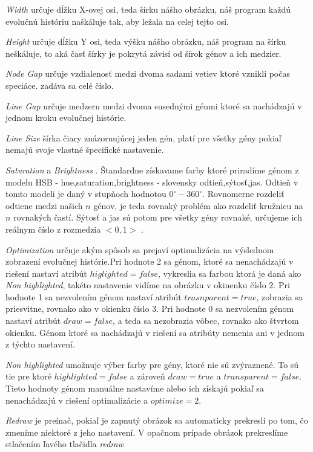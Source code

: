 \emph{Width} určuje dĺžku X-ovej osi, teda šírku nášho obrázku, náš program každú evolučnú históriu naškáluje tak, aby ležala na celej tejto osi.

\emph{Height} určuje dĺžku Y osi, teda výšku nášho obrázku, náš program na šírku neškáluje, to aká časť šírky je pokrytá závisí od šírok génov a ich medzier.

\emph{Node Gap} určuje vzdialenosť medzi dvoma sadami vetiev ktoré vznikli počas speciáce. zadáva sa celé číslo.

\emph{Line Gap} určuje medzeru medzi dvoma susednými génmi ktoré sa nachádzajú v jednom kroku evolučnej histórie.

\emph{Line Size} šírka čiary znázornujúcej jeden gén, platí pre všetky gény pokiaľ nemajú svoje vlastné špecifické nastavenie.

\emph{Saturation} a \emph{Brightness} . Štandardne získavame farby ktoré priradíme génom z modelu HSB - hue,saturation,brightness - slovensky odtieň,sýtosť,jas.
Odtieň v tomto modeli je daný v stupňoch hodnotou $0^\circ-360^\circ$. Rovnomerne rozdeliť odtiene medzi našich $n$ génov,
 je teda rovnaký problém ako rozdeliť kružnicu na $n$ rovnakých častí. Sýtosť a jas sú potom pre všetky gény rovnaké, určujeme ich reálnym číslo z rozmedzia $<0,1>$ .

\emph{Optimization} určuje akým spôsob sa prejaví optimalizácia na výslednom zobrazení evolučnej histórie.Pri hodnote 2 sa génom, ktoré sa nenachádzajú v riešení nastaví atribút $higlighted=false$, vykreslia sa farbou ktorá je daná ako \emph{Non highlighted},
takéto nastavenie vidíme na obrázku \cite{obr:opt} v okinenku číslo 2. Pri hodnote 1 sa nezvolením génom nastaví atribút $trasnparent=true$, zobrazia sa priesvitne, rovnako ako v okienku číslo 3.
Pri hodnote 0 sa nezvolením génom nastaví atribút $draw=false$, a teda sa nezobrazia vôbec, rovnako ako štvrtom okienku. Génom ktoré sa nachádzajú v riešení sa atribúty nemenia ani v jednom z týchto nastavení.

\emph{Non highlighted} umožnuje výber farby pre gény, ktoré nie sú zvýraznené. To sú tie pre ktoré $highlighted=false$ a zároveň $draw=true$ a $transparent=false$. Tieto hodnoty génom manuálne nastavíme alebo ich získajú pokiaľ sa nenachádzajú v riešení optimalizácie a $optimize=2$.

\emph{Redraw} je preínač, pokiaľ je zapnutý obrázok sa automaticky prekreslí po tom, čo zmeníme niektoré z jeho nastavení. 
V opačnom prípade obrázok prekreslíme stlačením ľavého tlačidla \emph{redraw}
